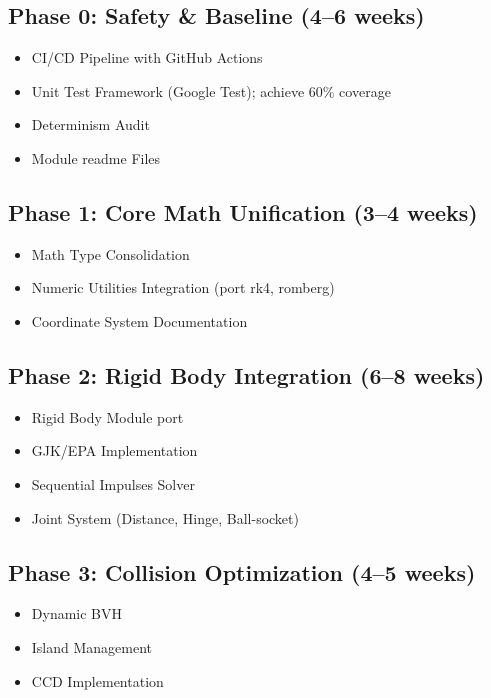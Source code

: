 \documentclass[11pt]{article}
\begin{document}
\subsection{Phase 0: Safety \& Baseline (4--6 weeks)}

\begin{itemize}
  \item CI/CD Pipeline with GitHub Actions
  \item Unit Test Framework (Google Test); achieve 60\% coverage
  \item Determinism Audit
  \item Module readme Files
\end{itemize}

\subsection{Phase 1: Core Math Unification (3--4 weeks)}

\begin{itemize}
  \item Math Type Consolidation
  \item Numeric Utilities Integration (port rk4, romberg)
  \item Coordinate System Documentation
\end{itemize}

\subsection{Phase 2: Rigid Body Integration (6--8 weeks)}

\begin{itemize}
  \item Rigid Body Module port
  \item GJK/EPA Implementation
  \item Sequential Impulses Solver
  \item Joint System (Distance, Hinge, Ball-socket)
\end{itemize}

\subsection{Phase 3: Collision Optimization (4--5 weeks)}

\begin{itemize}
  \item Dynamic BVH
  \item Island Management
  \item CCD Implementation
\end{itemize}
\end{document}
